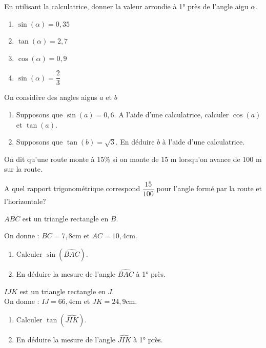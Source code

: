 

\begin{exercice}
En utilisant la calculatrice, donner la valeur arrondie à 1° près de l'angle aigu $\alpha$.

\begin{multicols}{2}
\begin{enumerate}
\item $\sin(\alpha)=0,35$

\item $\tan(\alpha)=2,7$

\item $\cos(\alpha)=0,9$

\item $\sin(\alpha)=\dfrac{2}{3}$

\end{enumerate}
 \end{multicols}
\end{exercice}

\begin{exercice}
On considère des angles aigus $a$ et $b$
\begin{enumerate}
\item Supposons que $\sin(a)=0,6$. A l'aide d'une calculatrice, calculer $\cos(a)$ et $\tan(a)$.
\item Supposons que $\tan(b)=\sqrt{3}$. En déduire $b$ à l'aide d'une calculatrice.
\end{enumerate}
\end{exercice}

\begin{exercice}
On dit qu'une route monte à $15\%$ si on monte de 15 m lorsqu'on avance de 100 m sur la route.

A quel rapport  trigonométrique correspond $\dfrac{15}{100}$ pour l'angle formé par la route et l'horizontale?
\end{exercice}

\begin{exercice}
$ABC$ est un triangle rectangle en $B$.

On donne : $BC=7,8$cm et $AC=10,4$cm.
\begin{enumerate}
\item Calculer $\sin\left(\widehat{BAC} \right)$.
\item En déduire la mesure de l'angle $\widehat{BAC}$ à 1° près. 
\end{enumerate}
\end{exercice}

\begin{exercice}
$IJK$ est un triangle rectangle en $J$.\\
On donne : $IJ=66,4$cm et $JK=24,9$cm.
\begin{enumerate}
\item Calculer $\tan\left(\widehat{JIK} \right)$.
\item En déduire la mesure de l'angle $\widehat{JIK}$ à 1° près. 
\end{enumerate}
\end{exercice}


